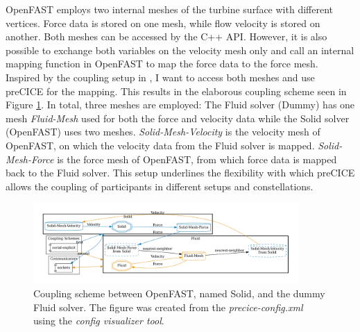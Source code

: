 OpenFAST employs two internal meshes of the turbine surface with different vertices. Force data is stored on one mesh, while flow velocity is stored on another. Both meshes can be accessed by the C++ API. However, it is also possible to exchange both variables on the velocity mesh only and call an internal mapping function in OpenFAST to map the force data to the force mesh. Inspired by the coupling setup in \cite{Taschner:2022}, I want to access both meshes and use preCICE for the mapping. This results in the elaborous coupling scheme seen in Figure \ref{fig:openfast:coupling}. In total, three meshes are employed: The Fluid solver (Dummy) has one mesh \textit{Fluid-Mesh} used for both the force and velocity data while the Solid solver (OpenFAST) uses two meshes. \textit{Solid-Mesh-Velocity} is the velocity mesh of OpenFAST, on which the velocity data from the Fluid solver is mapped. \textit{Solid-Mesh-Force} is the force mesh of OpenFAST, from which force data is mapped back to the Fluid solver. This setup underlines the flexibility with which preCICE allows the coupling of participants in different setups and constellations.

\begin{figure}[h]
	\centering
	\includegraphics[width=0.9\textwidth]{images/openfast-dummy-coupling-scheme.png}
	\caption{Coupling scheme between OpenFAST, named Solid, and the dummy Fluid solver. The figure was created from the \textit{precice-config.xml} using the \textit{config visualizer tool}\protect\footnotemark.}
	\label{fig:openfast:coupling}
\end{figure}


